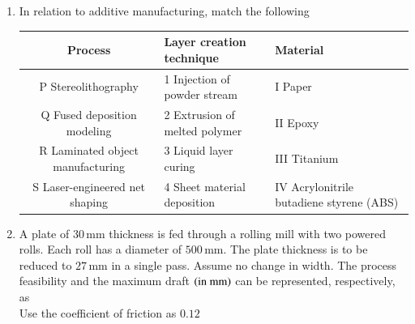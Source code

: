 \documentclass[journal]{IEEEtran}
\begin{document}
\begin{enumerate}[leftmargin=0pt]
\item
In relation to additive manufacturing, match the following


\begin{center}
\begin{tabularx}{\textwidth}{|c|X|X|}
\hline
\textbf{Process} & \textbf{Layer creation technique} & \textbf{Material} \\
\hline
P Stereolithography & 1 Injection of powder stream & I Paper \\
\hline
Q Fused deposition modeling & 2 Extrusion of melted polymer & II Epoxy \\
\hline
R Laminated object manufacturing & 3 Liquid layer curing & III Titanium \\
\hline
S Laser-engineered net shaping & 4 Sheet material deposition & IV Acrylonitrile butadiene styrene (ABS) \\
\hline
\end{tabularx}
\end{center}

\begin{enumerate}
\end{enumerate}
\hfill{}

\item
A plate of $30\,\text{mm}$ thickness is fed through a rolling mill with two powered rolls. Each roll has a diameter of $500\,\text{mm}$. The plate thickness is to be reduced to $27\,\text{mm}$ in a single pass. Assume no change in width. The process feasibility and the maximum draft $\left(\text{in mm}\right)$ can be represented, respectively, as\\
Use the coefficient of friction as $0.12$
\begin{enumerate}
\end{enumerate}
\hfill{}


\end{enumerate}
\end{document}
